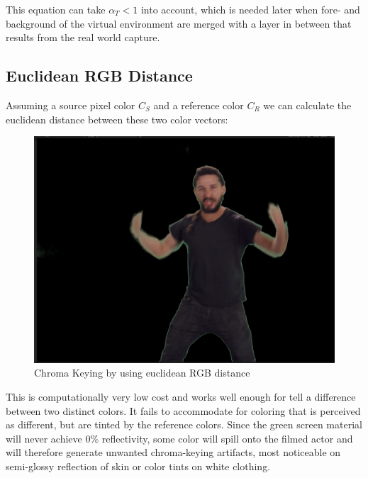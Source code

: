 
This equation can take $\alpha_T < 1$ into account, which is needed later when 
fore- and background of the virtual environment are merged with a layer in 
between that results from the real world capture.

\subsection{Euclidean RGB Distance}
Assuming a source pixel color $C_S$ and a reference color $C_R$ we can 
calculate the euclidean distance between these two color vectors:

\begin{figure}[htb]
	\includegraphics[width=\textwidth]{_raw_resources/Comparison_RGB_color.png}
	\caption{Chroma Keying by using euclidean RGB distance}
	\label{fig:chroma:euclidean:rgb}
\end{figure} 

This is computationally very low cost and works well enough for tell a 
difference between two distinct colors. It fails to accommodate for coloring 
that is perceived as different, but are tinted by the reference colors. Since 
the green screen material will never achieve 0\% reflectivity, some color will 
spill onto the filmed actor and will therefore generate unwanted chroma-keying 
artifacts, most noticeable on semi-glossy reflection of skin or color tints on 
white clothing.

